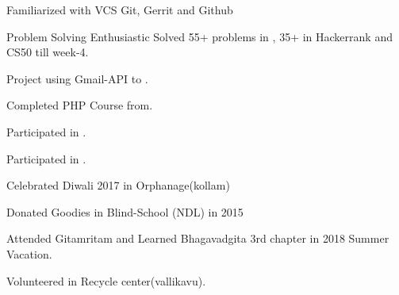 \documentclass[]{deedy-resume-openfont}
\begin{document}
\begin{minipage}[t]{0.66\textwidth}
\begin{tightemize}
\item Familiarized with VCS Git, Gerrit and  Github
\item Problem Solving Enthusiastic Solved 55+ problems in \href {https://codeforces.com/profile/GopaVasanth}{}, 35+ in Hackerrank and CS50 till week-4.
\item  Project using Gmail-API to \href{https://github.com/gopavasanth/Gmail_API_Project}{}.
\item Completed PHP Course from\href{https://www.codecademy.com/users/gopavasanth1999/achievements}{}.
\item Participated in \href{https://drive.google.com/file/d/1JKGJCkn5d5uI3oBTDaTysU3fZ42_dchx/view?usp=sharing}{}.
\item Participated in  \href{https://drive.google.com/file/d/1OfbEQp4wSgmnpXS6KylOLwqhZRRhTFoz/view?usp=sharing}{}.
\end{tightemize}
\sectionsep



\begin{tightemize}
\item Celebrated Diwali 2017 in Orphanage(kollam) \item Donated Goodies in Blind-School (NDL) in 2015 \item Attended Gitamritam and Learned Bhagavadgita 3rd chapter in 2018 Summer Vacation. \item Volunteered in Recycle center(vallikavu). 
\end{tightemize}





\end{minipage}
\end{document}
